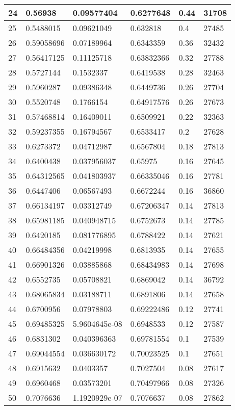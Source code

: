 \begin{longtable}{|l|l|l|l|l|l|}
24 & 0.56938 & 0.09577404 & 0.6277648 & 0.44 & 31708 \\ \hline 
25 & 0.5488015 & 0.09621049 & 0.632818 & 0.4 & 27485 \\ \hline 
26 & 0.59058696 & 0.07189964 & 0.6343359 & 0.36 & 32432 \\ \hline 
27 & 0.56417125 & 0.11125718 & 0.63832366 & 0.32 & 27788 \\ \hline 
28 & 0.5727144 & 0.1532337 & 0.6419538 & 0.28 & 32463 \\ \hline 
29 & 0.5960287 & 0.09386348 & 0.6449736 & 0.26 & 27704 \\ \hline 
30 & 0.5520748 & 0.1766154 & 0.64917576 & 0.26 & 27673 \\ \hline 
31 & 0.57468814 & 0.16409011 & 0.6509921 & 0.22 & 32363 \\ \hline 
32 & 0.59237355 & 0.16794567 & 0.6533417 & 0.2 & 27628 \\ \hline 
33 & 0.6273372 & 0.04712987 & 0.6567804 & 0.18 & 27813 \\ \hline 
34 & 0.6400438 & 0.037956037 & 0.65975 & 0.16 & 27645 \\ \hline 
35 & 0.64312565 & 0.041803937 & 0.66335046 & 0.16 & 27781 \\ \hline 
36 & 0.6447406 & 0.06567493 & 0.6672244 & 0.16 & 36860 \\ \hline 
37 & 0.66134197 & 0.03312749 & 0.67206347 & 0.14 & 27813 \\ \hline 
38 & 0.65981185 & 0.040948715 & 0.6752673 & 0.14 & 27785 \\ \hline 
39 & 0.6420185 & 0.081776895 & 0.6788422 & 0.14 & 27621 \\ \hline 
40 & 0.66484356 & 0.04219998 & 0.6813935 & 0.14 & 27655 \\ \hline 
41 & 0.66901326 & 0.03885868 & 0.68434983 & 0.14 & 27698 \\ \hline 
42 & 0.6552735 & 0.05708821 & 0.6869042 & 0.14 & 36792 \\ \hline 
43 & 0.68065834 & 0.03188711 & 0.6891806 & 0.14 & 27658 \\ \hline 
44 & 0.6700956 & 0.07978803 & 0.69222486 & 0.12 & 27741 \\ \hline 
45 & 0.69485325 & 5.9604645e-08 & 0.6948533 & 0.12 & 27587 \\ \hline 
46 & 0.6831302 & 0.040396363 & 0.69781554 & 0.1 & 27539 \\ \hline 
47 & 0.69044554 & 0.036630172 & 0.70023525 & 0.1 & 27651 \\ \hline 
48 & 0.6915632 & 0.0403357 & 0.7027504 & 0.08 & 27617 \\ \hline 
49 & 0.6960468 & 0.03573201 & 0.70497966 & 0.08 & 27326 \\ \hline 
50 & 0.7076636 & 1.1920929e-07 & 0.7076637 & 0.08 & 27862 \\ \hline 
\end{longtable}